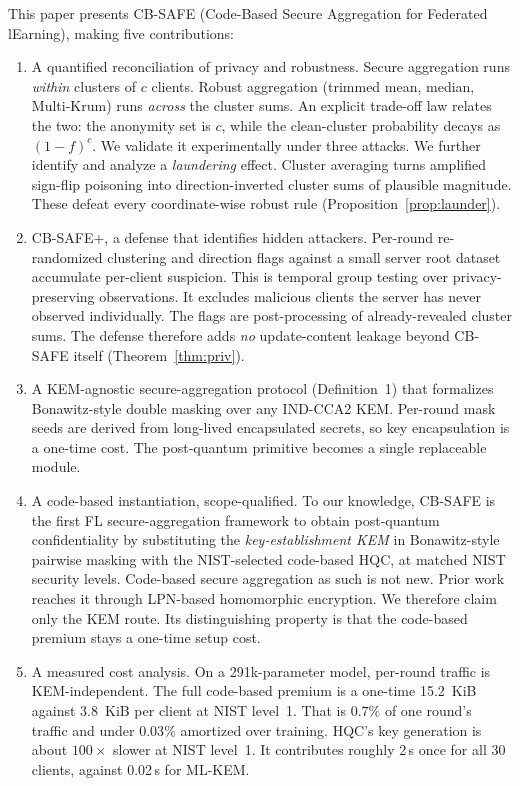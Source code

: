 \documentclass[lettersize,journal]{IEEEtran}
\begin{document}
This paper presents CB-SAFE (Code-Based Secure Aggregation for Federated
lEarning), making five contributions:
\begin{enumerate}\item A quantified reconciliation of privacy and robustness. Secure
aggregation runs \emph{within} clusters of $c$ clients. Robust aggregation (trimmed
mean, median, Multi-Krum) runs \emph{across} the cluster sums. An explicit trade-off
law relates the two: the anonymity set is $c$, while the clean-cluster probability
decays as $(1-f)^c$. We validate it experimentally under three attacks. We further
identify and analyze a \emph{laundering} effect. Cluster averaging turns amplified
sign-flip poisoning into direction-inverted cluster sums of plausible magnitude.
These defeat every coordinate-wise robust rule (Proposition~\ref{prop:launder}).
\item CB-SAFE+, a defense that identifies hidden attackers. Per-round
re-randomized clustering and direction flags against a small server root dataset
accumulate per-client suspicion. This is temporal group testing over
privacy-preserving observations. It excludes malicious clients the server has never
observed individually. The flags are post-processing of already-revealed cluster
sums. The defense therefore adds \emph{no} update-content leakage beyond CB-SAFE
itself (Theorem~\ref{thm:priv}).
\item A KEM-agnostic secure-aggregation protocol (Definition~1) that
formalizes Bonawitz-style double masking over any IND-CCA2 KEM. Per-round mask seeds
are derived from long-lived encapsulated secrets, so key encapsulation is a one-time
cost. The post-quantum primitive becomes a single replaceable module.
\item A code-based instantiation, scope-qualified. To our knowledge, CB-SAFE
is the first FL secure-aggregation framework to obtain post-quantum confidentiality
by substituting the \emph{key-establishment KEM} in Bonawitz-style pairwise masking
with the NIST-selected code-based HQC, at matched NIST security levels. Code-based
secure aggregation as such is not new. Prior work \cite{lpnsecagg2026} reaches it
through LPN-based homomorphic encryption. We therefore claim only the KEM route. Its
distinguishing property is that the code-based premium stays a one-time setup cost.
\item A measured cost analysis. On a 291k-parameter model, per-round traffic
is KEM-independent. The full code-based premium is a one-time 15.2~KiB against
3.8~KiB per client at NIST level~1. That is $0.7\%$ of one round's traffic and under
$0.03\%$ amortized over training. HQC's key generation is about $100\times$ slower at
NIST level~1. It contributes roughly 2\,s once for all 30 clients, against 0.02\,s
for ML-KEM.
\end{enumerate}
\end{document}
